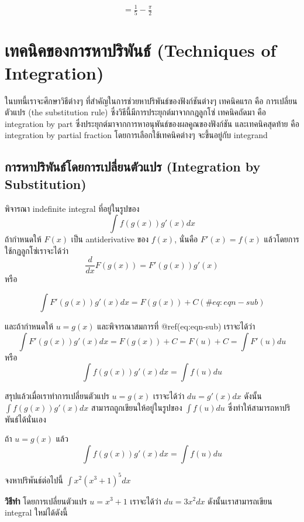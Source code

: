 \documentclass[
]{book}
\begin{document}
\(\qquad \qquad \qquad \qquad \qquad \qquad \qquad \ \ =\displaystyle
\frac{1}{5}- \frac{ \pi }{2}\)

\chapter{เทคนิคของการหาปริพันธ์ (Techniques of
Integration)}\label{uxe40uxe17uxe04uxe19uxe04uxe02uxe2duxe07uxe01uxe32uxe23uxe2buxe32uxe1buxe23uxe1euxe19uxe18-techniques-of-integration}

ในบทนี้เราจะศึกษาวิธีต่างๆ ที่สำคัญในการช่วยหาปริพันธ์ของฟังก์ชันต่างๆ เทคนิคแรก คือ
การเปลี่ยนตัวแปร (the substitution rule) ซึ่งวิธีนี้มีการประยุกต์มาจากกฎลูกโซ่
เทคนิคถัดมา คือ integration by part ซึ่งประยุกต์มาจากการหาอนุพันธ์ของผลคูณของฟังก์ชัน
และเทคนิคสุดท้าย คือ integration by partial fraction โดยการเลือกใช้เทคนิคต่างๆ
จะขึ้นอยู่กับ integrand

\section{การหาปริพันธ์โดยการเปลี่ยนตัวแปร (Integration by
Substitution)}\label{uxe01uxe32uxe23uxe2buxe32uxe1buxe23uxe1euxe19uxe18uxe42uxe14uxe22uxe01uxe32uxe23uxe40uxe1buxe25uxe22uxe19uxe15uxe27uxe41uxe1buxe23-integration-by-substitution}

พิจารณา indefinite integral ที่อยู่ในรูปของ \[\int f(g(x))g'(x) dx\] ถ้ากำหนดให้
\(F(x)\) เป็น antiderivative ของ \(f(x)\), นั่นคือ \(F'(x) = f(x)\)
แล้วโดยการใช้กฏลูกโซ่เราจะได้ว่า \[\frac{d}{dx} F(g(x)) = F'(g(x)) g'(x)\] หรือ

\begin{equation}    
    \int F'(g(x)) g'(x) dx = F(g(x)) + C
    (\#eq:eqn-sub)
\end{equation}

และถ้ากำหนดให้ \(u = g(x)\) และพิจารณาสมการที่ @ref(eq:eqn-sub) เราจะได้ว่า
\[\int F'(g(x)) g'(x) dx = F(g(x)) + C = F(u) + C = \int F'(u) du\] หรือ
\[\int f(g(x))g'(x) dx  = \int f(u) du\]

สรุปแล้วเมื่อเราทำการเปลี่ยนตัวแปร \(u = g(x)\) เราจะได้ว่า \(du = g'(x)dx\) ดังนั้น
\(\int f(g(x)) g'(x) dx\) สามารถถูกเขียนให้อยู่ในรูปของ \(\int f(u)du\)
ซึ่งทำให้สามารถหาปริพันธ์ได้นั่นเอง

ถ้า \(u = g(x)\) แล้ว \[\int f(g(x)) g'(x) dx  = \int f(u) du\]

จงหาปริพันธ์ต่อไปนี้ \(\int x^2 (x^3 + 1)^5 dx\)

\textbf{วิธีทำ} โดยการเปลี่ยนตัวแปร \(u = x^3 + 1\) เราจะได้ว่า
\(du = 3x^2 dx\) ดังนั้นเราสามารถเขียน integral ใหม่ได้ดังนี้
\end{document}
